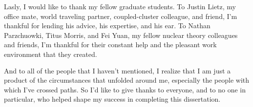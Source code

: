 \documentclass[../thesis.tex]{subfiles}
\begin{document}
Lasly, I would like to thank my fellow graduate students.  To Justin Lietz, my office mate, world traveling partner, coupled-cluster colleague, and friend, I'm thankful for lending his advice, his expertise, and his ear.  To Nathan Parzchuowki, Titus Morris, and Fei Yuan, my fellow nuclear theory colleagues and friends, I'm thankful for their constant help and the pleasant work environment that they created.

And to all of the people that I haven't mentioned, I realize that I am just a product of the circumstances that unfolded around me, especially the people with which I've crossed paths.  So I'd like to give thanks to everyone, and to no one in particular, who helped shape my success in completing this dissertation.
\end{document}
